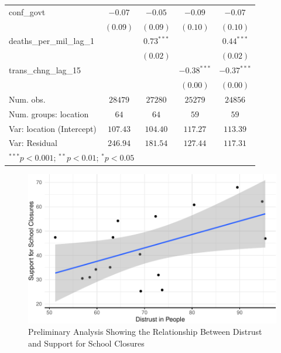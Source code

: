 \documentclass[
  11pt,
]{article}
\begin{document}
\begin{table}
\begin{center}
\begin{tabular}{l c c c c}
conf\_govt                & $-0.07$      & $-0.05$      & $-0.09$       & $-0.07$       \\
                          & $(0.09)$     & $(0.09)$     & $(0.10)$      & $(0.10)$      \\
deaths\_per\_mil\_lag\_1  &              & $0.73^{***}$ &               & $0.44^{***}$  \\
                          &              & $(0.02)$     &               & $(0.02)$      \\
trans\_chng\_lag\_15      &              &              & $-0.38^{***}$ & $-0.37^{***}$ \\
                          &              &              & $(0.00)$      & $(0.00)$      \\
\hline
Num. obs.                 & $28479$      & $27280$      & $25279$       & $24856$       \\
Num. groups: location     & $64$         & $64$         & $59$          & $59$          \\
Var: location (Intercept) & $107.43$     & $104.40$     & $117.27$      & $113.39$      \\
Var: Residual             & $246.94$     & $181.54$     & $127.44$      & $117.31$      \\
\hline
\multicolumn{5}{l}{\scriptsize{$^{***}p<0.001$; $^{**}p<0.01$; $^{*}p<0.05$}}
\end{tabular}
\label{tab:addit}
\end{center}
\end{table}

\begin{figure}
\includegraphics[width=0.8\linewidth]{write_up_test_files/figure-latex/yougov-1} \caption{Preliminary Analysis Showing the Relationship Between Distrust and Support for School Closures}\label{fig:yougov}
\end{figure}
\end{document}
